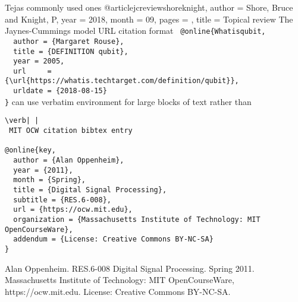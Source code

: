 Tejas commonly used ones
\citep{nielsen2004quantum}
\citep{gerry2005introductory} \citep{caneva2011chopped} \citet{PaolaMIT2012}
\citep{2006quant.ph.12095L} \cite{jcreviewshoreknight}
@article{jcreviewshoreknight,
author = {Shore, Bruce and Knight, P},
year = {2018},
month = {09},
pages = {},
title = {Topical review The Jaynes-Cummings model}
}
URL citation format
\verb| @online{Whatisqubit,|\\
\verb|  author = {Margaret Rouse},|\\
\verb|  title = {DEFINITION qubit},|\\
\verb|  year = 2005,|\\
\verb|  url     = |\\
\verb|{\url{https://whatis.techtarget.com/definition/qubit}},|\\
\verb|  urldate = {2018-08-15}|\\
\verb|}|
can use verbatim environment for large blocks of text rather than  
\begin{verbatim}
\verb| |
 MIT OCW citation bibtex entry
 
@online{key,
  author = {Alan Oppenheim},
  year = {2011},
  month = {Spring},
  title = {Digital Signal Processing},
  subtitle = {RES.6-008},
  url = {https://ocw.mit.edu},
  organization = {Massachusetts Institute of Technology: MIT OpenCourseWare},
  addendum = {License: Creative Commons BY-NC-SA}
}
\end{verbatim}
Alan Oppenheim. RES.6-008 Digital Signal Processing. Spring 2011. Massachusetts Institute of Technology: MIT OpenCourseWare, https://ocw.mit.edu. License: Creative Commons BY-NC-SA.
